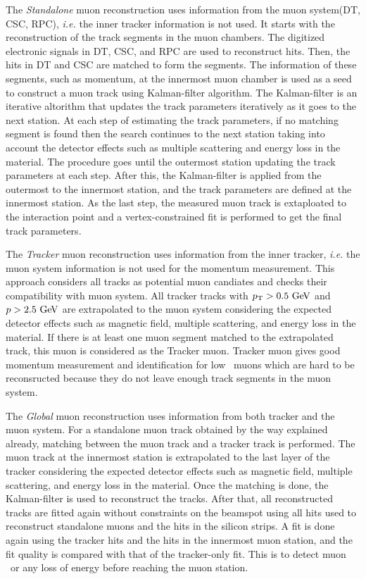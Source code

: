 The \textit{Standalone} muon reconstruction uses information from 
the muon system(DT, CSC, RPC), \textit{i.e.} the inner tracker information is not used. 
It starts with the reconstruction of the track segments in the muon chambers. 
The digitized electronic signals in DT, CSC, and RPC are used to 
reconstruct hits. Then, the hits in DT and CSC are matched to form the segments. 
The information of these segments, such as momentum, at the innermost 
muon chamber is used as a seed to construct a muon track using Kalman-filter 
algorithm. The Kalman-filter is an iterative altorithm 
that updates the track parameters iteratively as it goes to the next station. 
At each step of estimating the track parameters, if no matching segment is found 
then the search continues to the next station taking into account the detector 
effects such as multiple scattering and energy loss in the material. 
The procedure goes until the outermost station updating the track parameters 
at each step. After this, the Kalman-filter is applied from the outermost to 
the innermost station, and the track parameters are defined at the innermost 
station. As the last step, the measured muon track is extaploated to the interaction 
point and a vertex-constrained fit is performed to get the final track parameters. 

The \textit{Tracker} muon reconstruction uses information from  
the inner tracker, \textit{i.e.} the muon system information is not used
for the momentum measurement. This approach considers all tracks as 
potential muon candiates and checks their compatibility with 
muon system. All tracker tracks with $p_\mathrm{T}>0.5~\mathrm{Ge\kern -0.1em V}$ and $p>2.5~\mathrm{Ge\kern -0.1em V}$ 
are extrapolated to the muon system considering the expected detector effects 
such as magnetic field, multiple scattering, and energy loss in the material. 
If there is at least one muon segment matched to the 
extrapolated track, this muon is considered as the Tracker muon. 
Tracker muon gives good momentum measurement and identification for low \pt\ muons
which are hard to be reconsructed because they do not leave enough track segments 
in the muon system. 

The \textit{Global} muon reconstruction uses information from both tracker 
and the muon system. For a standalone muon track obtained by the way explained 
already, matching between the muon track and a tracker track is performed. 
The muon track at the innermost station is extrapolated to the last layer 
of the tracker considering the expected detector effects 
such as magnetic field, multiple scattering, and energy loss in the material.
Once the matching is done, the Kalman-filter is used to reconstruct the tracks. 
After that, all reconstructed tracks are fitted again without constraints on the 
beamspot using all hits used to reconstruct standalone muons and the hits 
in the silicon strips. A fit is done again using the tracker hits and the 
hits in the innermost muon station, and the fit quality is compared with 
that of the tracker-only fit. This is to detect muon \brem\  or 
any loss of energy before reaching the muon station.

